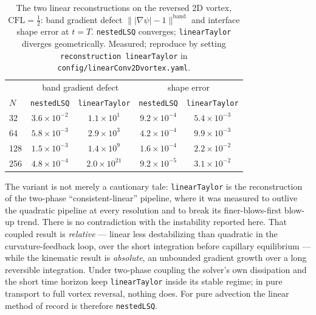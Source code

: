 \documentclass[preprint,3p,11pt]{elsarticle}
\newcommand{\psilev}{\psi}
\begin{document}
\begin{table}[t]
  \centering
  \caption{The two linear reconstructions on the reversed 2D vortex,
  $\mathrm{CFL}=\tfrac12$: band gradient defect
  $\bigl\||\nabla\psilev|-1\bigr\|^{\mathrm{band}}$ and interface shape error at
  $t=T$. \texttt{nestedLSQ} converges; \texttt{linearTaylor} diverges
  geometrically. Measured; reproduce by setting \texttt{reconstruction
  linearTaylor} in \texttt{config/linearConv2Dvortex.yaml}.}
  \label{tab:lintaylor}
  \begin{tabular}{lcccc}
  \toprule
   & \multicolumn{2}{c}{band gradient defect} & \multicolumn{2}{c}{shape error} \\
  $N$ & \texttt{nestedLSQ} & \texttt{linearTaylor} & \texttt{nestedLSQ} & \texttt{linearTaylor} \\
  \midrule
  32  & $3.6\times10^{-2}$ & $1.1\times10^{1}$  & $9.2\times10^{-4}$ & $5.4\times10^{-3}$ \\
  64  & $5.8\times10^{-3}$ & $2.9\times10^{3}$  & $4.2\times10^{-4}$ & $9.9\times10^{-3}$ \\
  128 & $1.5\times10^{-3}$ & $1.4\times10^{9}$  & $1.6\times10^{-4}$ & $2.2\times10^{-2}$ \\
  256 & $4.8\times10^{-4}$ & $2.0\times10^{21}$ & $9.2\times10^{-5}$ & $3.1\times10^{-2}$ \\
  \bottomrule
  \end{tabular}
\end{table}

The variant is not merely a cautionary tale: \texttt{linearTaylor} is the
reconstruction of the two-phase ``consistent-linear'' pipeline, where it was
measured to outlive the quadratic pipeline at every resolution and to break
its finer-blows-first blow-up trend. There is no contradiction with the
instability reported here. That coupled result is \emph{relative} --- linear
less destabilizing than quadratic in the curvature-feedback loop, over the
short integration before capillary equilibrium --- while the kinematic result
is \emph{absolute}, an unbounded gradient growth over a long reversible
integration. Under two-phase coupling the solver's own dissipation and the
short time horizon keep \texttt{linearTaylor} inside its stable regime; in pure
transport to full vortex reversal, nothing does. For pure advection the linear
method of record is therefore \texttt{nestedLSQ}.
\end{document}
